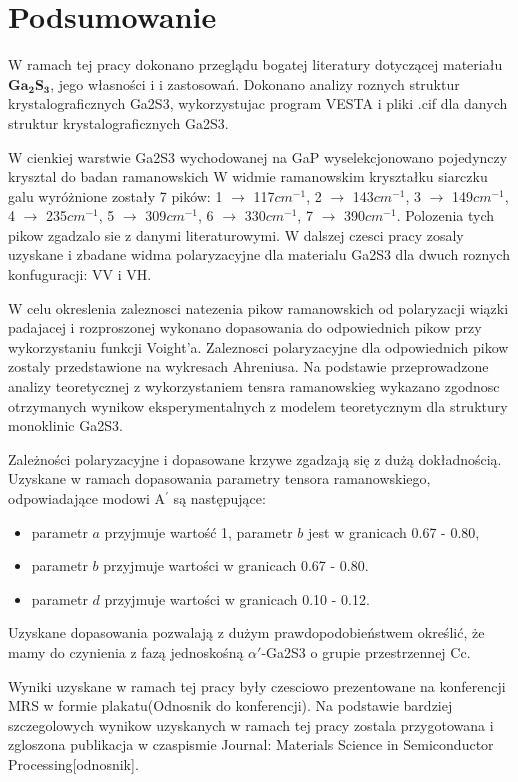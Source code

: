 \newpage

\section{Podsumowanie}

W ramach tej pracy dokonano przeglądu bogatej literatury  dotyczącej materiału $\mathbf{Ga_{2}S_{3}}$, jego własności i i zastosowań. Dokonano analizy roznych struktur krystalograficznych Ga2S3, wykorzystujac program VESTA i pliki .cif dla danych struktur krystalograficznych Ga2S3.

W cienkiej warstwie Ga2S3 wychodowanej na GaP wyselekcjonowano pojedynczy krysztal do badan ramanowskich
W widmie ramanowskim kryształku siarczku galu wyróżnione zostały 7 pików: 1 $\rightarrow$ 117$cm^{-1}$, 2 $\rightarrow$ 143$cm^{-1}$, 3 $\rightarrow$ 149$cm^{-1}$, 4 $\rightarrow$ 235$cm^{-1}$, 5 $\rightarrow$ 309$cm^{-1}$, 6 $\rightarrow$ 330$cm^{-1}$, 7 $\rightarrow$ 390$cm^{-1}$. Polozenia tych pikow zgadzalo sie z danymi literaturowymi. W dalszej czesci pracy zosaly uzyskane i zbadane widma polaryzacyjne dla materialu Ga2S3 dla dwuch roznych konfuguracji: VV i VH. 

W celu okreslenia zaleznosci natezenia pikow ramanowskich od polaryzacji wiązki padajacej i rozproszonej wykonano dopasowania do odpowiednich pikow przy wykorzystaniu funkcji Voight'a. Zaleznosci polaryzacyjne dla odpowiednich pikow zostaly przedstawione na wykresach Ahreniusa. Na podstawie przeprowadzone analizy teoretycznej z wykorzystaniem tensra ramanowskieg wykazano zgodnosc otrzymanych wynikow eksperymentalnych z modelem teoretycznym dla struktury monoklinic Ga2S3.

Zależności polaryzacyjne i dopasowane krzywe zgadzają się z dużą dokładnością. Uzyskane w ramach dopasowania parametry tensora ramanowskiego, odpowiadające modowi A$^{'}$ są następujące:
\begin{itemize}
	\item parametr $a$ przyjmuje wartość 1, parametr $b$ jest w granicach 0.67 - 0.80, 
	\item parametr $b$ przyjmuje wartości w granicach 0.67 - 0.80.
	\item parametr $d$ przyjmuje wartości w granicach 0.10 - 0.12.
\end{itemize}

Uzyskane dopasowania pozwalają z dużym prawdopodobieństwem określić, że mamy do czynienia z fazą jednoskośną $\alpha'$-Ga2S3 o grupie przestrzennej Cc.

Wyniki uzyskane w ramach tej pracy były czesciowo prezentowane na konferencji MRS w formie plakatu(Odnosnik do konferencji). Na podstawie bardziej szczegolowych wynikow uzyskanych w ramach tej pracy zostala przygotowana i zgloszona publikacja w czaspismie Journal: Materials Science in Semiconductor Processing[odnosnik].

